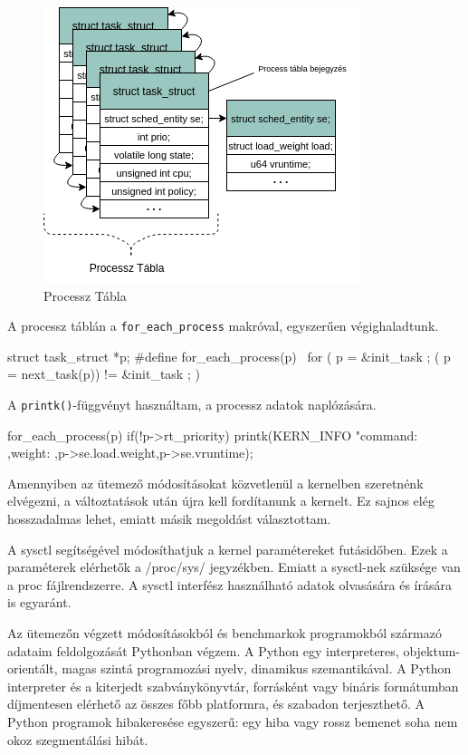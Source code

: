 \begin{figure}[h!]
\centering
\includegraphics[scale=0.75]{images/processTable.png}
\caption{Processz Tábla}
\label{fig:structurehierarchi}
\end{figure}

\noindent A processz táblán a \texttt{for\_each\_process} makróval, egyszerűen végighaladtunk.
\begin{cpp}
struct task_struct *p;
#define for_each_process(p) \
	 for ( p = &init_task ; ( p = next_task(p)) != &init_task ; )
\end{cpp}
A \texttt{printk()}-függvényt használtam, a processz adatok naplózására.
\begin{cpp}
     for_each_process(p)
        if(!p->rt_priority)
            printk(KERN_INFO "command:%
            ,weight:%
            ,p->se.load.weight,p->se.vruntime);

\end{cpp}

Amennyiben az ütemező módosításokat közvetlenül a kernelben szeretnénk elvégezni, a változtatások után újra kell fordítanunk a kernelt.
Ez sajnos elég hosszadalmas lehet, emiatt másik megoldást választottam.

A sysctl segítségével módosíthatjuk a kernel paramétereket futásidőben. Ezek a paraméterek elérhetők a /proc/sys/ jegyzékben. Emiatt a sysctl-nek szüksége van a proc fájlrendszerre. A sysctl interfész használható adatok olvasására és írására is egyaránt.

Az ütemezőn végzett módosításokból és benchmarkok programokból származó adataim feldolgozását Pythonban végzem.
A Python egy interpreteres, objektum-orientált, magas szintá programozási nyelv, dinamikus szemantikával.
A Python interpreter és a kiterjedt szabványkönyvtár, forrásként vagy bináris formátumban díjmentesen elérhető az összes főbb platformra, és szabadon terjeszthető.
A Python programok hibakeresése egyszerű: egy hiba vagy rossz bemenet soha nem okoz szegmentálási hibát.

